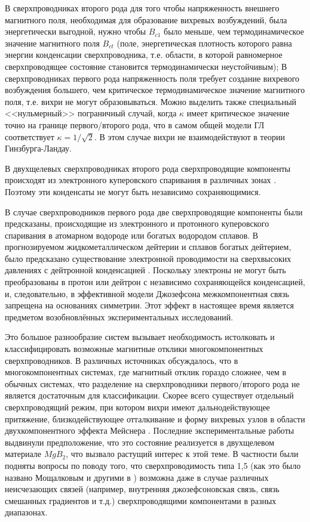 В сверхпроводниках второго рода для того чтобы напряженность внешнего 
магнитного поля, необходимая для образование вихревых возбуждений, была 
энергетически выгодной, нужно чтобы \( B_{c1} \) было меньше, чем 
термодинамическое значение магнитного поля \( B_{ct} \) (поле, энергетическая 
плотность которого равна энергии конденсации сверхпроводника, т.е. области, в 
которой равномерное сверхпроводящее состояние становится термодинамически 
неустойчивым); В сверхпроводниках первого рода напряженность поля требует 
создание вихревого возбуждения большего, чем критическое термодинамическое 
значение магнитного поля, т.е. вихри не могут образовываться. Можно выделить 
также специальный <<нульмерный>> пограничный случай, когда \( \kappa \) имеет 
критическое значение точно на границе первого/второго рода, что в самом общей 
модели ГЛ соответствует \( \kappa = 1/\sqrt{2} \). В этом случае вихри не 
взаимодействуют в теории Гинзбурга-Ландау.

В двухщелевых сверхпроводниках второго рода сверхпроводящие компоненты 
происходят из электронного куперовского спаривания в различных зонах 
\cite{bib:6}. Поэтому эти конденсаты не могут быть независимо сохраняющимися.

В случае сверхпроводников первого рода две сверхпроводящие компоненты были 
предсказаны, происходящие из электронного и протонного куперовского спаривания 
в атомарном водороде или богатых водородом сплавов. В прогнозируемом 
жидкометаллическом дейтерии и сплавов богатых дейтерием, было предсказано 
существование электронной проводимости на сверхвысоких давлениях с дейтронной 
конденсацией  \cite{bib:12.1,bib:12.2,bib:13,bib:14}. Поскольку электроны не 
могут быть преобразованы в протон или дейтрон с независимо сохраняющейся 
конденсацией, и, следовательно, в эффективной модели Джозефсона 
межкомпонентная связь запрещена на основаниях симметрии. Этот эффект в 
настоящее время является предметом возобновлённых экспериментальных 
исследований.

Это большое разнообразие систем вызывает необходимость истолковать и 
классифицировать возможные магнитные отклики многокомпонентных 
сверхпроводников. В различных источниках обсуждалось, что в многокомпонентных 
системах, где магнитный отклик гораздо сложнее, чем в обычных системах, что 
разделение на сверхпроводники первого/второго рода не является достаточным для 
классификации. Скорее всего существует отдельный сверхпроводящий режим, при 
котором вихри имеют дальнодействующее притяжение, близкодействующее 
отталкивание и форму вихревых узлов в области двухкомпонентного эффекта 
Мейснера \cite{bib:1,bib:2}. Последние экспериментальные работы 
\cite{bib:16,bib:17} выдвинули предположение, что это состояние реализуется в 
двухщелевом материале \( MgB_2 \), что вызвало растущий интерес к этой теме. В 
частности были подняты вопросы по поводу того, что сверхпроводимость типа 1,5 
(как это было названо Мощалковым и другими в \cite{bib:16}) возможна даже в 
случае различных неисчезающих связей (например, внутренняя джозефсоновская 
связь, связь смешанных градиентов и т.д.) сверхпроводящими компонентами в 
разных диапазонах. \cite{bib:main}

